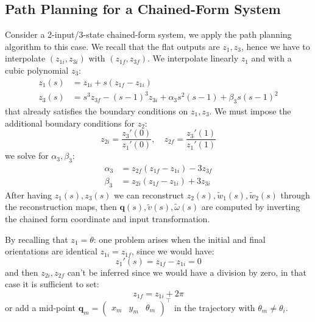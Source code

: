 \documentclass[10pt, a4paper]{report}
\newcommand{\q}{{\mathbf q}}
\begin{document}
\subsection{Path Planning for a Chained-Form System}
Consider a 2-input/3-state chained-form system, we apply the path planning algorithm to this case. We recall that the flat outputs are $z_1,z_3$, hence we have to interpolate $(z_{1i},z_{3i})$ with $(z_{1f},z_{3f})$. We interpolate linearly $z_1$ and with a cubic polynomial $z_3$:\begin{align}
    z_1(s)&=z_{1i}+s(z_{1f}-z_{1i})\\
    z_3(s)&=s^3z_{3f}-(s-1)^3z_{3i}+\alpha_3s^2(s-1)+\beta_3s(s-1)^2
\end{align}
that already satisfies the boundary conditions on $z_1,z_3$. We must impose the additional boundary conditions for $z_2$:\begin{equation}
    z_{2i}=\frac{z_3'(0)}{z_1'(0)},\quad 
    z_{2f}=\frac{z_3'(1)}{z_1'(1)}
\end{equation}
we solve for $\alpha_3,\beta_3$:\begin{align}
    \alpha_3&=z_{2f}(z_{1f}-z_{1i})-3z_{3f}
    \\
    \beta_3&=z_{2i}(z_{1f}-z_{1i})+3z_{3i}
\end{align}
After having $z_1(s),z_3(s)$ we can reconstruct $z_2(s),\tilde w_1(s),\tilde w_2(s)$ through the reconstruction maps, then $\q(s),\tilde v(s),\tilde\omega(s)$ are computed by inverting
the chained form coordinate and input transformation. 

By recalling that $z_1=\theta$: one problem arises when the initial and final orientations are identical $z_{1i}=z_{1f}$, since we would have:\begin{equation}
    z_1'(s)=z_{1f}-z_{1i}=0
\end{equation}
and then $z_{2i},z_{2f}$ can't be inferred since we would have a division by zero, in that case it is sufficient to set:\begin{equation}
    z_{1f}=z_{1i}+2\pi
\end{equation}
or add a mid-point $\q_m=\begin{pmatrix}
    x_m&y_m&\theta_m
\end{pmatrix}^\top$ in the trajectory with $\theta_m\ne\theta_i$.
\end{document}
